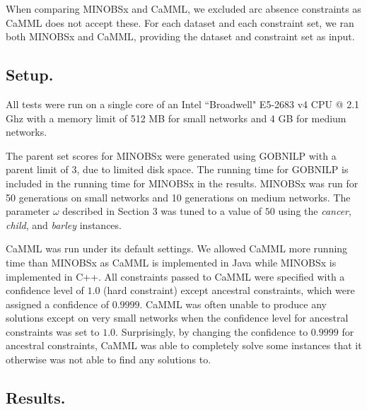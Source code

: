 \documentclass[twoside,11pt]{article}
\begin{document}
When comparing MINOBSx and CaMML, we excluded arc absence constraints as CaMML does not accept these. 
For each dataset and each constraint set, we ran both MINOBSx and CaMML, providing the dataset and constraint set as input. 

\subsection{Setup.}

All tests were run on a single core of an Intel ``Broadwell" E5-2683 v4 CPU @ 2.1 Ghz with a memory limit of 512 MB for small networks and 4 GB for medium networks. 

\smallskip
The parent set scores for MINOBSx were generated using GOBNILP \citep{Bartlett2017} with a parent limit of 3, due to limited disk space. The running time for GOBNILP is included in 
the running time for MINOBSx in the results. MINOBSx was run for 50 generations on small networks and 10 generations on medium networks. The parameter
$\omega$ described in Section 3 was tuned to a value of $50$ using the \emph{cancer}, \emph{child}, and \emph{barley} instances. 

\smallskip
CaMML was run under its default settings. We allowed CaMML more running time than MINOBSx as CaMML
is implemented in Java while MINOBSx is implemented in C++. All constraints passed to CaMML were specified with a confidence level of $1.0$ (hard constraint) except ancestral constraints, which were assigned a confidence of $0.9999$. CaMML was often unable to produce any solutions except on very small networks when the 
confidence level for ancestral constraints was set to $1.0$. Surprisingly, by changing the confidence to $0.9999$ for ancestral constraints, CaMML was able to completely solve
some instances that it otherwise was not able to find any solutions to. 

\subsection{Results.}
\end{document}
